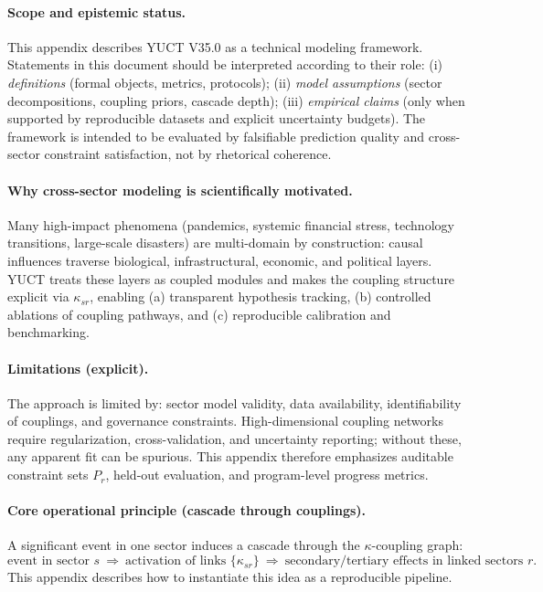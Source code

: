 \documentclass[13pt,a4paper]{article}
\begin{document}
	\paragraph{Scope and epistemic status.}
	This appendix describes YUCT V35.0 as a technical modeling framework. Statements in this document should be interpreted according to their role:
	(i) \emph{definitions} (formal objects, metrics, protocols);
	(ii) \emph{model assumptions} (sector decompositions, coupling priors, cascade depth);
	(iii) \emph{empirical claims} (only when supported by reproducible datasets and explicit uncertainty budgets).
	The framework is intended to be evaluated by falsifiable prediction quality and cross-sector constraint satisfaction, not by rhetorical coherence.
	
	\paragraph{Why cross-sector modeling is scientifically motivated.}
	Many high-impact phenomena (pandemics, systemic financial stress, technology transitions, large-scale disasters) are multi-domain by construction: causal influences traverse biological, infrastructural, economic, and political layers. YUCT treats these layers as coupled modules and makes the coupling structure explicit via $\kappa_{sr}$, enabling (a) transparent hypothesis tracking, (b) controlled ablations of coupling pathways, and (c) reproducible calibration and benchmarking.
	
	\paragraph{Limitations (explicit).}
	The approach is limited by: sector model validity, data availability, identifiability of couplings, and governance constraints. High-dimensional coupling networks require regularization, cross-validation, and uncertainty reporting; without these, any apparent fit can be spurious. This appendix therefore emphasizes auditable constraint sets $P_r$, held-out evaluation, and program-level progress metrics.
	
	\paragraph{Core operational principle (cascade through couplings).}
	A significant event in one sector induces a cascade through the $\kappa$-coupling graph:
	\[
	\text{event in sector }s \ \Rightarrow\ \text{activation of links }\{\kappa_{sr}\}\ \Rightarrow\ \text{secondary/tertiary effects in linked sectors }r.
	\]
	This appendix describes how to instantiate this idea as a reproducible pipeline.
\end{document}
